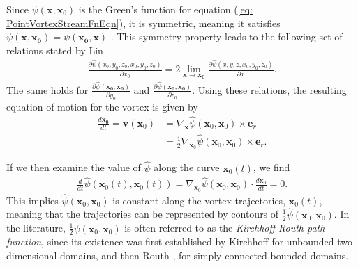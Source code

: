 \documentclass{sfuthesis}
\begin{document}
Since $\psi(\mathbf{x},\mathbf{x}_0)$ is the Green's function for equation (\ref{eq: PointVortexStreamFnEqn}), it is symmetric, meaning it satisfies $\psi(\mathbf{x},\mathbf{x_0})=\psi(\mathbf{x_0},\mathbf{x})$ \cite{Evans98}.
This symmetry property leads to the following set of relations stated by Lin \cite{Lin41} 
\begin{align*}
	\frac{\partial \hat{\psi}(x_0,y_0,z_0, x_0, y_0, z_0)}{\partial x_0}=2 \lim_{\mathbf{x}\to\mathbf{x_0}} \frac{\partial \hat{\psi}(x,y,z,x_0,y_0,z_0)}{\partial x}.
\end{align*}
The same holds for $\frac{\partial \hat{\psi}(\mathbf{x_0},\mathbf{x_0})}{\partial y_0}$ and $\frac{\partial \hat{\psi}(\mathbf{x_0},\mathbf{x_0})}{\partial z_0}$.
\noindent Using these relations, the resulting equation of motion for the vortex is given by 
\begin{align*}
	\frac{d\mathbf{x_0}}{dt}=\mathbf{v}(\mathbf{x}_0)&=\nabla_{\mathbf{x}} \hat{\psi}(\mathbf{x}_0,\mathbf{x}_0) \times {\mathbf{e}}_r\\
        &=\frac{1}{2}{\nabla}_{\mathbf{x}_0}\hat{\psi}(\mathbf{x}_0,\mathbf{x}_0)\times {\mathbf{e}}_r.
\end{align*}

If we then examine the value of $\hat{\psi}$ along the curve $\mathbf{x}_0(t)$, we find 
\begin{align*}
	\frac{d}{dt}\hat{\psi}(\mathbf{x}_0(t),\mathbf{x}_0(t))={\nabla}_{\mathbf{x}_0}\hat{\psi}(\mathbf{x}_0,\mathbf{x}_0)\cdot \frac{d\mathbf{x}_0}{dt}=0.
\end{align*}
This implies $\hat{\psi}(\mathbf{x}_0,\mathbf{x}_0)$ is constant along the vortex trajectories, $\mathbf{x}_0(t)$, meaning that the trajectories can be represented by contours of $\frac{1}{2}\hat{\psi}(\mathbf{x}_0,\mathbf{x}_0)$. In the literature, $\frac{1}{2}\hat{\psi}(\mathbf{x}_0,\mathbf{x}_0)$ is often referred to as the \textit{Kirchhoff-Routh path function}, since its existence was first established by Kirchhoff \cite{Kirch76} for unbounded two dimensional domains, and then Routh \cite{Routh80}, for simply connected bounded domains. 
\end{document}
